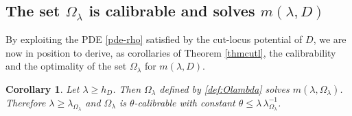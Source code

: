 \documentclass[reqno,11pt]{amsart}
\newtheorem{corollary}[theorem]{Corollary}
\theoremstyle{definition}
\numberwithin{equation}{section}
\newcommand{\1}{{{\bf 1}\kern-0,28em\rm l}}
\def\O{\Omega}
\def\l{\lambda}
\begin{document}






\subsection{ The set $\Omega_\lambda$ is calibrable and solves $m(\l,D)$}
\label{mlOl}
By exploiting the PDE \eqref{pde-rho} satisfied by the cut-locus potential of $D$,   
we are now in position to derive, as corollaries of Theorem \ref{thmcutl}, the calibrability and the optimality of the set $\O_\l$ for $m(\l,D)$.


\begin{corollary}\label{lemcalibr2}
Let $\l \ge h_D$.  Then $\O_\l$ defined by \eqref{def:Olambda} solves $m(\l, \O_\l)$. Therefore $\l\ge \l_{\O_\l}$ and $\O_\l$  is  $\theta$-calibrable with constant $\theta\le \lambda\, \lambda_{\O_\l}^{-1}$.
\end{corollary}

\end{document}
